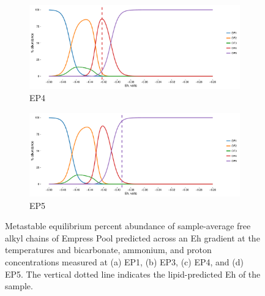 \begin{figure}[h]\ContinuedFloat
\centering

    \begin{subfigure}[b]{\linewidth}
       	\includegraphics[width=1\linewidth]{"figs_app2/Empress OF4_thermo"}
       	\caption{EP4}
        \label{fig:EP4_thermo}
    \end{subfigure}
    \begin{subfigure}[b]{\linewidth}
    	\includegraphics[width=1\linewidth]{"figs_app2/Empress OF5_thermo"}
    	\caption{EP5}
        \label{fig:EP5_thermo}
    \end{subfigure}
    
    \caption{Metastable equilibrium percent abundance of sample-average free alkyl chains of Empress Pool predicted across an Eh gradient at the temperatures and bicarbonate, ammonium, and proton concentrations measured at (a) EP1, (b) EP3, (c) EP4, and (d) EP5. The vertical dotted line indicates the lipid-predicted Eh of the sample.}
    \label{fig:EP_thermo}
\end{figure}

\newpage

